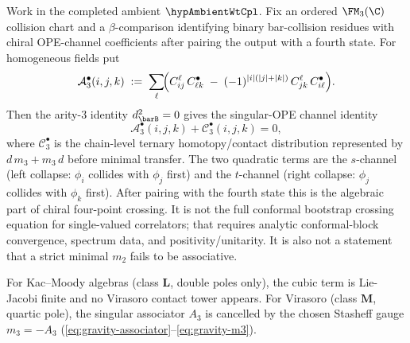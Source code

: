\begin{theorem}
\label{thm:crossing-stasheff}%
%
Work in the completed ambient \(\hypAmbientWtCpl\). Fix an ordered
\(\FM_3(\C)\) collision chart and a \(\beta\)-comparison identifying
binary bar-collision residues with chiral OPE-channel coefficients
after pairing the output with a fourth state. For homogeneous fields
put
\begin{equation}\label{eq:stasheff-crossing}
\mathcal A_3^\bullet(i,j,k)
\;:=\;
\sum_{\ell}\!\Bigl(
 C^\ell_{ij}\,C^{\bullet}_{\ell k}
 \;-\;
 (-1)^{|i|(|j|+|k|)}\,
 C^\ell_{jk}\,C^{\bullet}_{i\ell}
\Bigr).
\end{equation}
Then the arity-$3$ identity \(d_{\barB}^2=0\) gives the
singular-OPE channel identity
\[
\mathcal A_3^\bullet(i,j,k)+\mathcal C_3^\bullet(i,j,k)=0,
\]
where \(\mathcal C_3^\bullet\) is the chain-level ternary
homotopy/contact distribution represented by \(d\,m_3+m_3\,d\)
before minimal transfer.  The two quadratic terms are the
$s$-channel (left collapse:
$\phi_i$ collides with $\phi_j$ first) and the
$t$-channel (right collapse: $\phi_j$ collides with $\phi_k$
first). After pairing with the fourth state this is the algebraic
part of chiral four-point crossing. It is not the full conformal
bootstrap crossing equation for single-valued correlators; that
requires analytic conformal-block convergence, spectrum data, and
positivity/unitarity. It is also not a statement that a strict
minimal \(m_2\) fails to be associative.

For Kac--Moody algebras (class
$\mathbf{L}$, double poles only), the cubic term is Lie-Jacobi
finite and no Virasoro contact tower appears. For Virasoro
(class $\mathbf{M}$, quartic pole), the singular associator
\(A_3\) is cancelled by the chosen Stasheff gauge \(m_3=-A_3\)
\textup{(}\eqref{eq:gravity-associator}--\eqref{eq:gravity-m3}\textup{)}.
\end{theorem}

